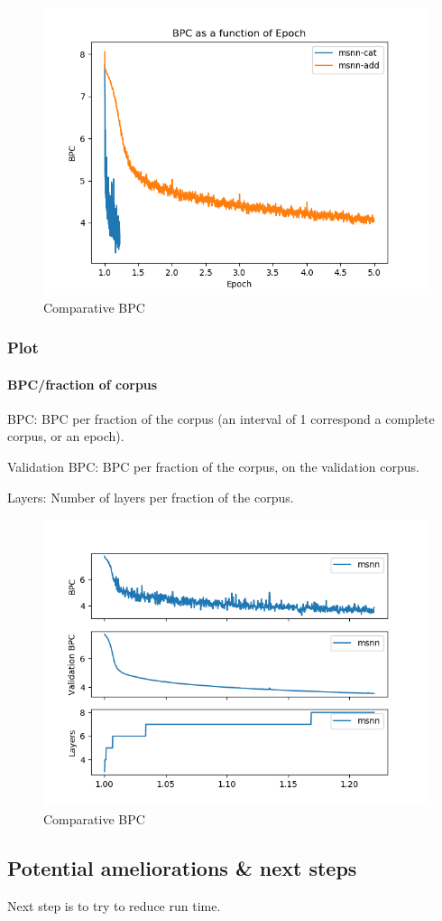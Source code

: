 \begin{figure}[h]
\centering
\includegraphics{parts/appendix/reports-gmsnn/docs_esteban-latex/test_reports/comparative-bpc-msnn-det-msnn-cat.png}
\caption{Comparative BPC}
\end{figure}

\subsubsection{Plot}

\paragraph{BPC/fraction of corpus}

BPC: BPC per fraction of the corpus (an interval of 1 correspond a
complete corpus, or an epoch).

Validation BPC: BPC per fraction of the corpus, on the validation
corpus.

Layers: Number of layers per fraction of the corpus.
\begin{figure}[h]
	\centering
\includegraphics{parts/appendix/reports-gmsnn/docs_esteban-latex/test_reports/msnn-4/2018_05_17-13h49.png}
\caption{Comparative BPC}
\end{figure}

\newpage
\subsection{Potential ameliorations \& next steps}

Next step is to try to reduce run time.
